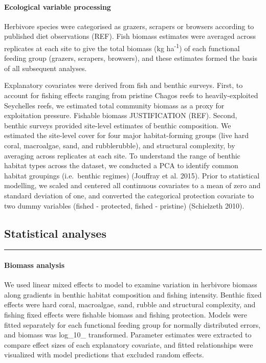 \documentclass[]{article}
\let\oldparagraph\paragraph
\renewcommand{\paragraph}[1]{\oldparagraph{#1}\mbox{}}
\begin{document}
\paragraph{Ecological variable
processing}\label{ecological-variable-processing}

Herbivore species were categorised as grazers, scrapers or browsers
according to published diet observations (REF). Fish biomass estimates
were averaged across replicates at each site to give the total biomass
(kg ha\textsuperscript{-1}) of each functional feeding group (grazers,
scrapers, browsers), and these estimates formed the basis of all
subsequent analyses.

Explanatory covariates were derived from fish and benthic surveys.
First, to account for fishing effects ranging from pristine Chagos reefs
to heavily-exploited Seychelles reefs, we estimated total community
biomass as a proxy for exploitation pressure. Fishable biomass
JUSTIFICATION (REF). Second, benthic surveys provided site-level
estimates of benthic composition. We estimated the site-level cover for
four major habitat-forming groups (live hard coral, macroalgae, sand,
and rubblerubble), and structural complexity, by averaging across
replicates at each site. To understand the range of benthic habitat
types across the dataset, we conducted a PCA to identify common habitat
groupings (i.e.~benthic regimes) (Jouffray et al. 2015). Prior to
statistical modelling, we scaled and centered all continuous covariates
to a mean of zero and standard deviation of one, and converted the
categorical protection covariate to two dummy variables (fished -
protected, fished - pristine) (Schielzeth 2010).

\subsection{Statistical analyses}\label{statistical-analyses}

\begin{center}\rule{0.5\linewidth}{\linethickness}\end{center}

\paragraph{Biomass analysis}\label{biomass-analysis}

We used linear mixed effects to model to examine variation in herbivore
biomass along gradients in benthic habitat composition and fishing
intensity. Benthic fixed effects were hard coral, macroalgae, sand,
rubble and structural complexity, and fishing fixed effects were
fishable biomass and fishing protection. Models were fitted separately
for each functional feeding group for normally distributed errors, and
biomass was log\_10\_ transformed. Parameter estimates were extracted to
compare effect sizes of each explanatory covariate, and fitted
relationships were visualized with model predictions that excluded
random effects.
\end{document}
